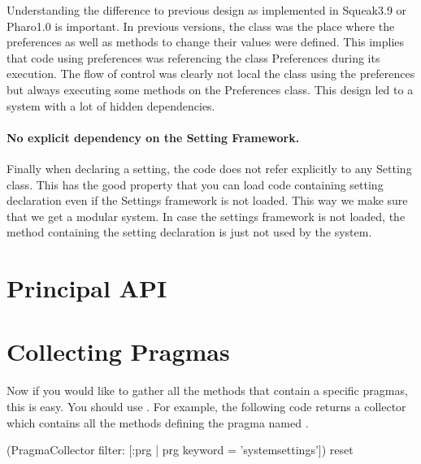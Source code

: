 \documentclass[a4paper,10pt,twoside]{book}
\begin{document}
Understanding the difference to previous design as implemented in Squeak3.9 or Pharo1.0 is important. In previous versions, the class  was the place where the preferences as well as methods to change their values were defined. This implies that code using preferences was  referencing the class Preferences during its execution. The flow of control was clearly not local the class using the preferences but always executing some methods on the Preferences class. This design led to a system with a lot of hidden dependencies. 

\paragraph{No explicit dependency on the Setting Framework.}
Finally when declaring a setting, the code does not refer explicitly to any Setting class. This has the good property that you can load code containing setting declaration even if the Settings framework is not loaded. This way we make sure 
that we get a modular system. In case the settings framework is not loaded, the method containing the setting declaration is just not used by the system.


\section{Principal API}


\section{Collecting Pragmas}

Now if you would like to gather all the methods that contain a specific pragmas, this is easy. You should use
. For example, the following code returns a collector which contains all the methods
defining the pragma named .


\begin{code}{}
(PragmaCollector filter: [:prg | prg keyword = 'systemsettings']) reset
\end{code}





\ifx\wholebook\relax\else
   
   
\end{document}
